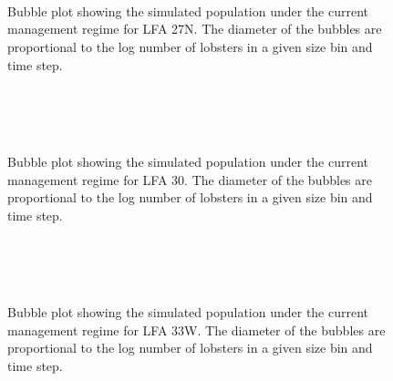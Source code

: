 \documentclass[11pt]{article}
\newcommand{\ebh}{/backup/bio_data/bio.lobster/figures/LFA2733Framework2018/} %
\begin{document}
    \begin{figure}
    \centering
                \\
                \\
                \\
        
         \caption{Bubble plot showing the simulated population under the current management regime for LFA 27N. The diameter of the bubbles are proportional to the log number of lobsters in a given size bin and time step.}
    \end{figure}
    
    \begin{figure}
    \centering
                \\
                \\
                \\
        
         \caption{Bubble plot showing the simulated population under the current management regime for LFA 30. The diameter of the bubbles are proportional to the log number of lobsters in a given size bin and time step.}
    \end{figure}
    
    \begin{figure}
    \centering
                \\
                \\
                \\
        
         \caption{Bubble plot showing the simulated population under the current management regime for LFA 33W. The diameter of the bubbles are proportional to the log number of lobsters in a given size bin and time step.}
    \end{figure}
    
\end{document}
